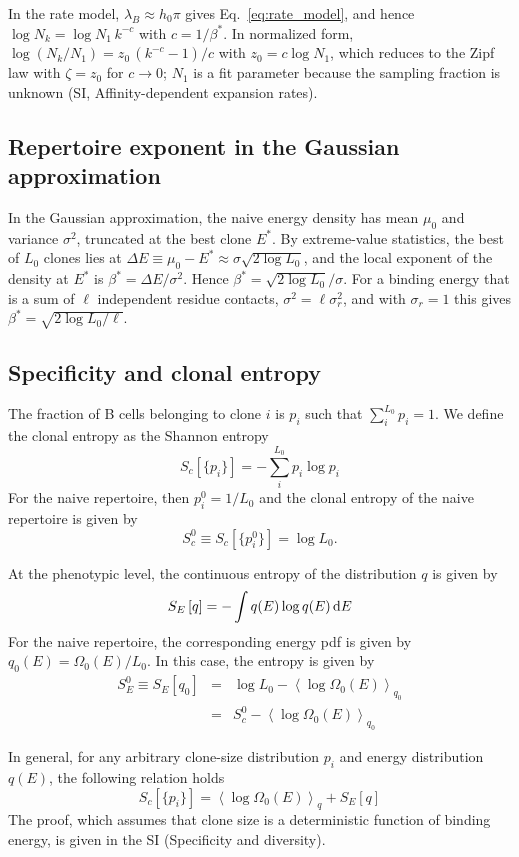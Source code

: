 \documentclass[aps, pre, twocolumn, 10pt, groupedaddress, superscriptaddress, linenumbers]{revtex4-2}
\newcommand{\EQ}{\begin{equation}}
\newcommand{\EE}{\end{equation}}
\newcommand{\EQA}{\begin{eqnarray}}
\newcommand{\EEA}{\end{eqnarray}}
\newcommand{\DG}{E}
\renewcommand{\d}{{\rm d}}
\newcommand{\lam}{\lambda}
\begin{document}
In the rate model, $\lam_B \approx h_0\pi$ gives Eq.~\ref{eq:rate_model}, and hence $\log N_k = \log N_1\, k^{-c}$ with $c = 1/\beta^*$.
In normalized form, $\log(N_k/N_1) = z_0\,(k^{-c} - 1)/c$ with $z_0 = c\log N_1$, which reduces to the Zipf law with $\zeta = z_0$ for $c \to 0$; $N_1$ is a fit parameter because the sampling fraction is unknown (SI, Affinity-dependent expansion rates).

\subsection*{Repertoire exponent in the Gaussian approximation}
In the Gaussian approximation, the naive energy density has mean $\mu_0$ and variance $\sigma^2$, truncated at the best clone $\DG^*$.
By extreme-value statistics, the best of $L_0$ clones lies at $\Delta\DG \equiv \mu_0 - \DG^* \approx \sigma\sqrt{2\log L_0}$, and the local exponent of the density at $\DG^*$ is $\beta^* = \Delta\DG/\sigma^2$.
Hence $\beta^* = \sqrt{2\log L_0}/\sigma$.
For a binding energy that is a sum of $\ell$ independent residue contacts, $\sigma^2 = \ell\sigma_r^2$, and with $\sigma_r = 1$ this gives $\beta^* = \sqrt{2\log L_0/\ell}$.


\subsection*{Specificity and clonal entropy}
The fraction of B cells belonging to clone $i$ is $p_i$ such that $\sum_i^{L_0}p_i = 1$.
We define the clonal entropy as the Shannon entropy
\EQ
S_c\left[\{p_i\}\right] = -\sum_i^{L_0} p_i \log p_i
\EE
For the naive repertoire, then $p^0_i=1/L_0$ and the clonal entropy of the naive repertoire is given by 
\EQ
S^0_c\equiv S_c\left[\{p^0_i\}\right]=\log L_0.
\EE

At the phenotypic level, the continuous entropy of the distribution $q$ is given by
\EQ
S_\DG\left[q\right] = -\int q(\DG)\log q(\DG) \, \d \DG 
\EE
For the naive repertoire, the corresponding energy pdf is given by $q_0(\DG) = \Omega_0(\DG)/L_0$.
In this case, the entropy is given by
\EQA
S_E^0\equiv S_\DG\left[q_0\right] &=& \log L_0 -\left\langle \log\Omega_0(E)\right\rangle_{q_0}\nonumber\\
&=& S_c^0 -\left\langle \log\Omega_0(E)\right\rangle_{q_0}
\EEA

In general, for any arbitrary clone-size distribution $p_i$ and energy distribution $q(\DG)$, the following relation holds
\EQ
S_c\left[\{p_i\}\right] = \left\langle \log\Omega_0(\DG)\right\rangle_{q} + S_\DG\left[q\right]
\label{eq:S_c_S_E}
\EE
The proof, which assumes that clone size is a deterministic function of binding energy, is given in the SI (Specificity and diversity).
\end{document}
